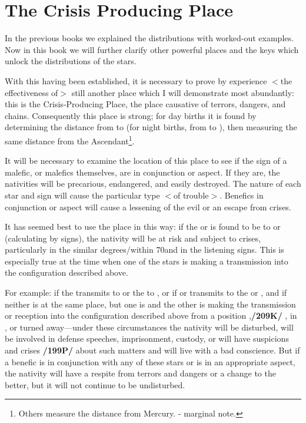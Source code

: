 \section{The Crisis Producing Place}

In the previous books we explained the distributions with worked-out examples. Now in this book we will further clarify other powerful places and the keys which unlock the distributions of the stars.

With this having been established, it is necessary to prove by experience $<$the effectiveness of$>$ still another place which I will demonstrate most abundantly: this is the Crisis-Producing Place, the place causative of terrors, dangers, and chains. Consequently this place is strong; for day births it is found by determining the distance from \Saturn\xspace to \Mars\xspace (for night births, from \Mars\xspace to \Saturn), then measuring the same distance from the Ascendant\footnote{Others measure the distance from Mercury. - marginal note.}.

It will be necessary to examine the location of this place to see if the
sign of a malefic, or malefics themselves, are in conjunction or aspect. If they are, the nativities will be precarious, endangered, and easily destroyed. The nature of each star and sign will cause the particular type $<$of trouble$>$. Benefics in conjunction or aspect will cause a lessening of the evil or an escape from crises.

It has seemed best to use the place in this way: if the \Sun\xspace or \Moon\xspace is found to be \Sextile\xspace to \Saturn\xspace or \Mars\xspace (calculating by signs), the nativity will be at risk and subject to crises, particularly in the similar degrees/within 70\deg and in the listening signs. This is especially true at the time when one of the stars is making a transmission into the configuration described above. 

For example: if the \Sun\xspace transmits to \Saturn\xspace
or the \Moon\xspace to \Mars\xspace, or if \Saturn\xspace or \Mars\xspace transmits to the \Sun\xspace or \Moon\xspace, and if neither is at the same place, but one is \Sextile\xspace and the other is making the transmission or reception into the configuration described
above from a position \Square,\textbf{/209K/} \Trine, in \Opposition, or turned away—under these circumstances the nativity will be disturbed, will be involved in defense speeches, imprisonment, custody, or will have suspicions and crises \textbf{/199P/} about such matters and will live with a bad conscience. But if a benefic is in conjunction with any of these stars or is in an appropriate aspect, the nativity will have a respite from terrors and dangers or a change to the better, but it will not continue to be undisturbed. 

